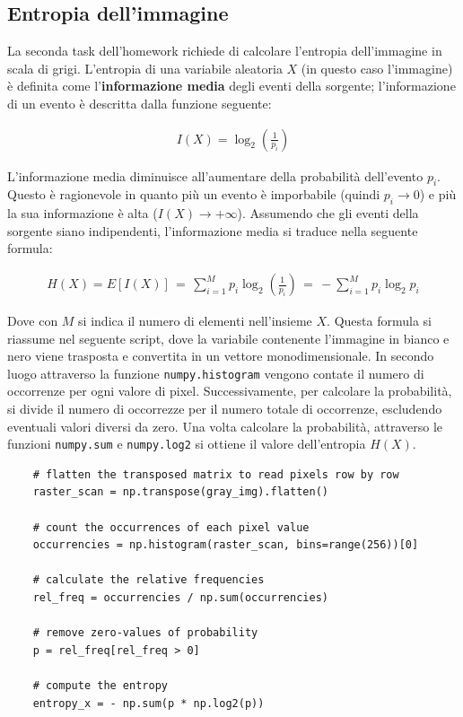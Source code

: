 \subsection{Entropia dell'immagine}\label{img-entropy}
La seconda task dell'homework richiede di calcolare l'entropia dell'immagine in scala di grigi. L'entropia di una variabile aleatoria $X$ (in questo caso l'immagine) è definita come l'\textbf{informazione media} degli eventi della sorgente; l'informazione di un evento è descritta dalla funzione seguente:

\begin{gather*}
    I(X) = \log_2\left( \frac{1}{p_i} \right)
\end{gather*}

\noindent L'informazione media diminuisce all'aumentare della probabilità dell'evento $p_i$. Questo è ragionevole in quanto più un evento è imporbabile (quindi $p_i \to 0$) e più la sua informazione è alta ($I(X) \to +\infty$). Assumendo che gli eventi della sorgente siano indipendenti, l'informazione media si traduce nella seguente formula:

\begin{gather*}
    H(X) = E[I(X)] \, = \, \sum_{i = 1}^M p_i\log_2\left( \frac{1}{p_i} \right) \, = \, - \sum_{i = 1}^M p_i\log_2{p_i}
\end{gather*}

\noindent Dove con $M$ si indica il numero di elementi nell'insieme $X$. Questa formula si riassume nel seguente script, dove la variabile contenente l'immagine in bianco e nero viene trasposta e convertita in un vettore monodimensionale. In secondo luogo attraverso la funzione \texttt{numpy.histogram} vengono contate il numero di occorrenze per ogni valore di pixel. Successivamente, per calcolare la probabilità, si divide il numero di occorrezze per il numero totale di occorrenze, escludendo eventuali valori diversi da zero. Una volta calcolare la probabilità, attraverso le funzioni  \texttt{numpy.sum} e \texttt{numpy.log2} si ottiene il valore dell'entropia $H(X)$.


\begin{lstlisting}
    # flatten the transposed matrix to read pixels row by row
    raster_scan = np.transpose(gray_img).flatten()

    # count the occurrences of each pixel value
    occurrencies = np.histogram(raster_scan, bins=range(256))[0]

    # calculate the relative frequencies
    rel_freq = occurrencies / np.sum(occurrencies)

    # remove zero-values of probability
    p = rel_freq[rel_freq > 0]

    # compute the entropy
    entropy_x = - np.sum(p * np.log2(p))
\end{lstlisting}

